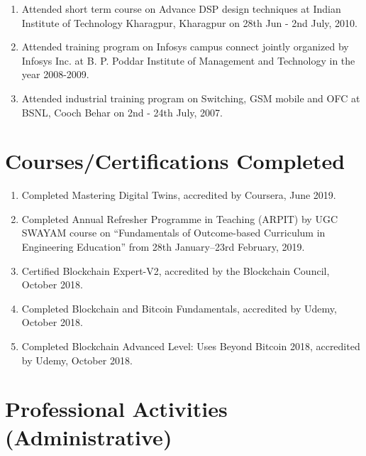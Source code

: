 \documentclass[11pt,a4paper]{moderncv}
\begin{document}
\begin{adjustwidth}{6em}{0pt}
\begin{enumerate}
		\item Attended short term course on Advance DSP design techniques at Indian Institute of Technology Kharagpur, Kharagpur on 28th Jun - 2nd July, 2010.
		
		\item Attended training program on Infosys campus connect jointly organized by Infosys Inc. at B. P. Poddar Institute of Management and Technology in the year 2008-2009.
		
		\item Attended industrial training program on Switching, GSM mobile and OFC at BSNL, Cooch Behar on 2nd - 24th July, 2007.
		
	\end{enumerate}
\end{adjustwidth}



\section{\textbf{Courses/Certifications Completed}}

\begin{adjustwidth}{6em}{0pt}
	\begin{enumerate}
		\item Completed Mastering Digital Twins, accredited by Coursera, June 2019.
		
		\item Completed Annual Refresher Programme in Teaching (ARPIT) by UGC SWAYAM course on “Fundamentals of Outcome-based Curriculum in Engineering Education” from 28th January–23rd February, 2019.
		
		\item Certified Blockchain Expert-V2, accredited by the Blockchain Council, October 2018.
		
		\item Completed Blockchain and Bitcoin Fundamentals, accredited by Udemy, October 2018.
		
		\item Completed Blockchain Advanced Level: Uses Beyond Bitcoin 2018, accredited by Udemy, October 2018.
		
	\end{enumerate}
\end{adjustwidth}



\section{\textbf{Professional Activities (Administrative)}}
\end{document}
